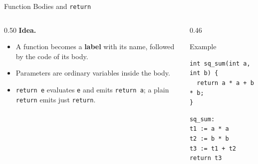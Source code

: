 \documentclass[aspectratio=169]{beamer}
\newcommand{\tc}[1]{\texttt{#1}}
\begin{document}
\begin{frame}[fragile]{Function Bodies and \tc{return}}
  \begin{columns}[T]
    \begin{column}{0.50\textwidth}
      \textbf{Idea.}
      \begin{itemize}
        \item A function becomes a \textbf{label} with its name,
              followed by the code of its body.
        \item Parameters are ordinary variables inside the body.
        \item \tc{return e} evaluates \tc{e} and emits \tc{return a};
              a plain \tc{return} emits just \tc{return}.
      \end{itemize}
    \end{column}
    \begin{column}{0.46\textwidth}
      \begin{block}{Example}
        \begin{verbatim}
int sq_sum(int a, int b) {
  return a * a + b * b;
}
        \end{verbatim}
        \vspace{0.3em}
        \begin{verbatim}
sq_sum:
t1 := a * a
t2 := b * b
t3 := t1 + t2
return t3
        \end{verbatim}
      \end{block}
    \end{column}
  \end{columns}
\end{frame}
\end{document}
